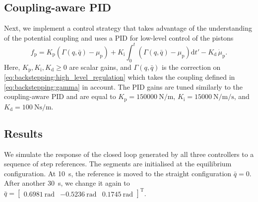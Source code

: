 %
\subsection{Coupling-aware PID}
%
Next, we implement a control strategy that takes advantage of the understanding of the potential coupling and uses a PID for low-level control of the pistons
%
\begin{equation}
    f_{\mathrm{p}} = K_\mathrm{p} \left (\Gamma(q, \bar{q})-\mu_\mathrm{p} \right ) +  K_\mathrm{i} \int_{0}^t \left ( \Gamma(q, \bar{q})-\mu_\mathrm{p} \right ) \mathrm{d}t' - K_\mathrm{d} \, \dot{\mu}_\mathrm{p}.
\end{equation}
%
Here, $K_\mathrm{p},K_\mathrm{i},K_\mathrm{d} \geq 0$ are scalar gains, and $\Gamma(q, \bar{q})$ is the correction on \eqref{eq:backstepping:high_level_regulation} which takes the coupling defined in \eqref{eq:backstepping:gamma} in account. 
%
The PID gains are tuned similarly to the coupling-aware PID
and are equal to $K_\mathrm{p} = \SI{150 000}{\newton \per \meter}$, $K_\mathrm{i} = \SI{15 000}{\newton \per \meter \per \second}$, and $K_\mathrm{d} = \SI{100}{\newton \second \per \meter}$. 

\subsection{Results}

We simulate the response of the closed loop generated by all three controllers to a sequence of step references. The segments are initialised at the equilibrium configuration. %
At \SI{10}{s}, the reference is moved to the straight configuration $\bar{q} =  0$. After another \SI{30}{s}, we change it again to $\bar{q} = \begin{bmatrix} \SI{0.6981}{\radian} & \SI{-0.5236}{\radian} & \SI{0.1745}{\radian} \end{bmatrix}^\mathrm{T}$.

